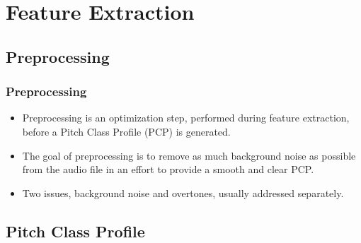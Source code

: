 \documentclass{beamer}
\begin{document}
\section[Feature Extraction]{Feature Extraction}


\subsection{Preprocessing}

\begin{frame}
	\frametitle{Preprocessing}
	
	\begin{itemize}
		\item Preprocessing is an optimization step, performed during feature extraction, before a Pitch Class Profile (PCP) is generated.
		\item The goal of preprocessing is to remove as much background noise as possible from the audio file in an effort to provide a smooth and clear PCP.
		\item Two issues, background noise and overtones, usually addressed separately.
	\end{itemize}
\end{frame}	

\subsection{Pitch Class Profile}
\end{document}

